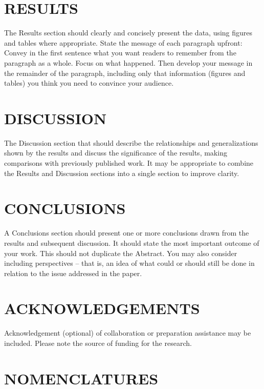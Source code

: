 \documentclass[10pt]{JoME}
\begin{document}
\section{RESULTS}

The Results section should clearly and concisely present the data, using figures and tables where appropriate. State the message of each paragraph upfront: Convey in the first sentence what you want readers to remember from the paragraph as a whole. Focus on what happened. Then develop your message in the remainder of the paragraph, including only that information (figures and tables) you think you need to convince your audience.

\section{DISCUSSION}

The Discussion section that should describe the relationships and generalizations shown by the results and discuss the significance of the results, making comparisons with previously published work. It may be appropriate to combine the Results and Discussion sections into a single section to improve clarity.

\section{CONCLUSIONS}

A Conclusions section should present one or more conclusions drawn from the results and subsequent discussion. It should state the most important outcome of your work. This should not duplicate the Abstract. You may also consider including perspectives -- that is, an idea of what could or should still be done in relation to the issue addressed in the paper.

\section{ACKNOWLEDGEMENTS}

Acknowledgement (optional) of collaboration or preparation assistance may be included. Please note the source of funding for the research.

\section{NOMENCLATURES}
\end{document}
